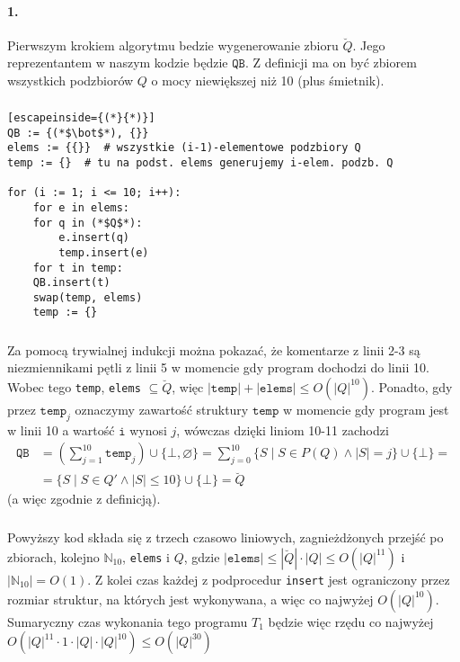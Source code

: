 \documentclass[12pt]{article}
\begin{document}
\paragraph{1.}
Pierwszym krokiem algorytmu bedzie wygenerowanie zbioru $\breve Q$.
Jego reprezentantem w naszym kodzie będzie $\texttt{QB}$. Z definicji ma on być zbiorem 
wszystkich podzbiorów $Q$ o mocy niewiększej niż 10 (plus śmietnik). 
\subparagraph{}
\begin{lstlisting}[escapeinside={(*}{*)}]
QB := {(*$\bot$*), {}}
elems := {{}}  # wszystkie (i-1)-elementowe podzbiory Q
temp := {}  # tu na podst. elems generujemy i-elem. podzb. Q

for (i := 1; i <= 10; i++):
    for e in elems:
	for q in (*$Q$*):
	    e.insert(q)
	    temp.insert(e)
    for t in temp:
	QB.insert(t)
    swap(temp, elems)
    temp := {}
\end{lstlisting}
\subparagraph{}
Za pomocą trywialnej indukcji można pokazać, że komentarze z linii 2-3 są niezmiennikami pętli z
linii 5 w momencie gdy program dochodzi do linii 10. Wobec tego
\texttt{temp}, \texttt{elems} $\subseteq \breve Q$, więc
$|\texttt{temp}|+|\texttt{elems}| \leq O(|Q|^{10})$.
Ponadto, gdy przez $\texttt{temp}_j$
oznaczymy zawartość struktury $\texttt{temp}$ w momencie gdy program jest w linii 10 
a wartość $\texttt{i}$ wynosi $j$, wówczas dzięki liniom 10-11 zachodzi
$$\begin{aligned}
	\texttt{QB} &= (\sum_{j=1}^{10} \texttt{temp}_j) \cup \{\bot, \varnothing\} 
	=\sum_{j=0}^{10} \{S \mid S \in P(Q) \land |S| = j\} \cup \{\bot\} = \\
	&= \{S \mid S \in Q' \land |S| \leq 10\} \cup \{\bot\} = \breve Q
\end{aligned}$$
 (a więc zgodnie z definicją).
\subparagraph{}
Powyższy kod składa się z trzech czasowo liniowych, zagnieżdżonych przejść po zbiorach, kolejno
$\mathbb{N}_{10}$, \texttt{elems} i $Q$, gdzie $|\texttt{elems}| \leq |\breve Q|
\cdot |Q| \leq O(|Q|^{11})$ \mbox{i $|\mathbb{N}_{10}| = O(1)$}. Z kolei czas każdej z podprocedur
\texttt{insert} jest ograniczony przez rozmiar struktur, na których jest wykonywana, a więc 
co najwyżej $O(|Q|^{10})$. Sumaryczny czas wykonania tego programu $T_1$ będzie więc rzędu
co najwyżej $O(|Q|^{11} \cdot 1 \cdot |Q| \cdot |Q|^{10}) \leq O(|Q|^{30})$
\end{document}
